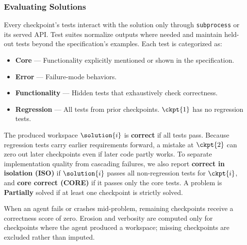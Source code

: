 \subsubsection{Evaluating Solutions}
Every checkpoint's tests interact with the solution only through \texttt{subprocess} or its served API. Test suites normalize outputs where needed and maintain held-out tests beyond the specification's examples. Each test is categorized as:
\begin{itemize}
    \item \textbf{Core} --- Functionality explicitly mentioned or shown in the specification.
    \item \textbf{Error} --- Failure-mode behaviors.
    \item \textbf{Functionality} --- Hidden tests that exhaustively check correctness.
    \item \textbf{Regression} --- All tests from prior checkpoints. $\ckpt{1}$ has no regression tests.
\end{itemize}

The produced workspace $\solution{i}$ is \textbf{correct} if all tests pass. Because regression tests carry earlier requirements forward, a mistake at $\ckpt{2}$ can zero out later checkpoints even if later code partly works. To separate implementation quality from cascading failures, we also report \textbf{correct in isolation (ISO)} if $\solution{i}$ passes all non-regression tests for $\ckpt{i}$, and \textbf{core correct (CORE)} if it passes only the core tests. A problem is \textbf{Partially} solved if at least one checkpoint is strictly solved.

When an agent fails or crashes mid-problem, remaining checkpoints receive a correctness score of zero. Erosion and verbosity are computed only for checkpoints where the agent produced a workspace; missing checkpoints are excluded rather than imputed.
